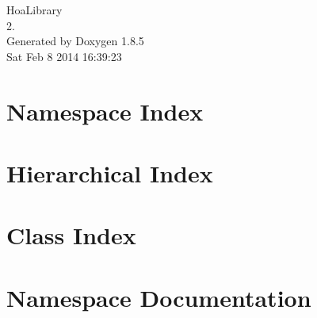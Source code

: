 \documentclass[twoside]{book}
\newcommand{\clearemptydoublepage}{%
  \newpage{\pagestyle{empty}\cleardoublepage}%
}
\begin{document}
\hypersetup{pageanchor=false}
\begin{titlepage}
\vspace*{7cm}
\begin{center}%
{\Large Hoa\-Library \\[1ex]\large 2. }\\
\vspace*{1cm}
{\large Generated by Doxygen 1.8.5}\\
\vspace*{0.5cm}
{\small Sat Feb 8 2014 16:39:23}\\
\end{center}
\end{titlepage}
\clearemptydoublepage
\tableofcontents
\clearemptydoublepage
{}
\hypersetup{pageanchor=true}

\chapter{Namespace Index}

\chapter{Hierarchical Index}

\chapter{Class Index}

\chapter{Namespace Documentation}


\end{document}
